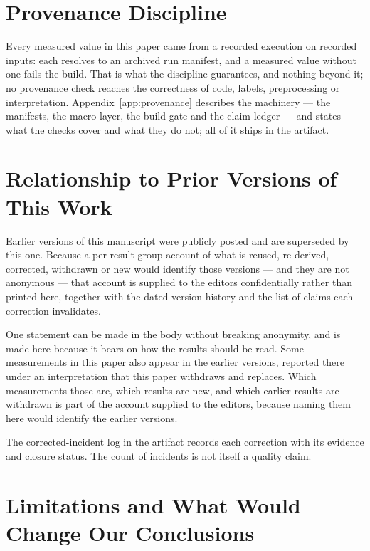 \documentclass[manuscript,anonymous,review]{acmart}
\begin{document}
\section{Provenance Discipline}
\label{sec:provenance}

Every measured value in this paper came from a recorded execution on recorded
inputs: each resolves to an archived run manifest, and a measured value without
one fails the build. That is what the discipline guarantees, and nothing beyond
it; no provenance check reaches the correctness of code, labels, preprocessing
or interpretation. Appendix~\ref{app:provenance} describes the machinery ---
the manifests, the macro layer, the build gate and the claim ledger --- and
states what the checks cover and what they do not; all of it ships in the
artifact.

\section{Relationship to Prior Versions of This Work}
\label{sec:disclosure}

Earlier versions of this manuscript were publicly posted and are superseded by
this one. Because a per-result-group account of what is reused, re-derived,
corrected, withdrawn or new would identify those versions --- and they are not
anonymous --- that account is supplied to the editors confidentially rather
than printed here, together with the dated version history and the list of
claims each correction invalidates.

One statement can be made in the body without breaking anonymity, and is
made here because it bears on how the results should be read. Some
measurements in this paper also appear in the earlier versions, reported there
under an interpretation that this paper withdraws and replaces. Which
measurements those are, which results are new, and which earlier results are
withdrawn is part of the account supplied to the editors, because naming them
here would identify the earlier versions.

The corrected-incident log in the artifact records each correction with its
evidence and closure status. The count of incidents is not itself a quality
claim.

\section{Limitations and What Would Change Our Conclusions}
\label{sec:threats}
\end{document}
